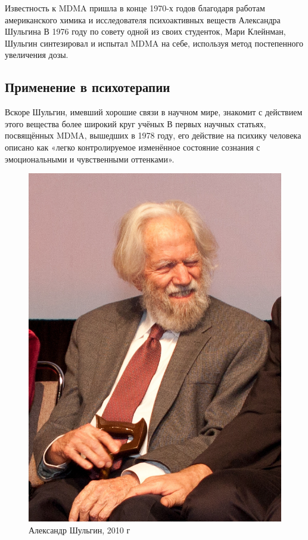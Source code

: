 \documentclass[a4paper,14pt,russian]{report}
\begin{document}
Известность к MDMA пришла в конце 1970-х годов благодаря работам американского химика и исследователя психоактивных веществ Александра Шульгина В 1976 году по совету одной из своих студенток, Мари Клейнман, Шульгин синтезировал и испытал MDMA на себе, используя метод постепенного увеличения дозы.

\subsection{Применение в психотерапии}

Вскоре Шульгин, имевший хорошие связи в научном мире, знакомит с действием этого вещества более широкий круг учёных В первых научных статьях, посвящённых MDMA, вышедших в 1978 году, его действие на психику человека описано как «легко контролируемое изменённое состояние сознания с эмоциональными и чувственными оттенками».

\begin{figure}[!htb]
\centerline{\includegraphics{shulgin}}
\caption{Александр Шульгин, 2010 г}
\end{figure}
\end{document}
